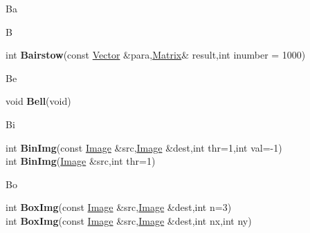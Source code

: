 \documentclass[10pt,titlepage]{article}
\def\functionlistentry#1#2#3#4#5#6{\noindent #1 {\bf #2}(#3) \dotfill #6\\}
\def\letterref#1{}
\def\letterlabel#1{\vspace{0.5cm}\centerline{\Large #1}}
\def\letterlabelend#1{}
\begin{document}
{{\letterlabel{Ba}
\letterlabel{B}
\letterref{A}
\letterref{B}
\letterref{C}
\letterref{D}
\letterref{E}
\letterref{F}
\letterref{G}
\letterref{H}
\letterref{I}
\letterref{K}
\letterref{L}
\letterref{M}
\letterref{N}
\letterref{O}
\letterref{P}
\letterref{Q}
\letterref{R}
\letterref{S}
\letterref{T}
\letterref{U}
\letterref{V}
\letterref{W}
\letterref{X}
\letterref{Y}
\letterref{Z}

\letterref{Ba}
\letterref{Be}
\letterref{Bi}
\letterref{Bo}
\letterlabelend{Ba}
\functionlistentry{int}{Bairstow}{const \hyperlink{Vector}{Vector} \&para,\hyperlink{Matrix}{Matrix}\& result,int inumber = 1000}{1399}{numeric}{}

\letterlabel{Be}
\letterref{A}
\letterref{B}
\letterref{C}
\letterref{D}
\letterref{E}
\letterref{F}
\letterref{G}
\letterref{H}
\letterref{I}
\letterref{K}
\letterref{L}
\letterref{M}
\letterref{N}
\letterref{O}
\letterref{P}
\letterref{Q}
\letterref{R}
\letterref{S}
\letterref{T}
\letterref{U}
\letterref{V}
\letterref{W}
\letterref{X}
\letterref{Y}
\letterref{Z}

\letterref{Ba}
\letterref{Be}
\letterref{Bi}
\letterref{Bo}
\letterlabelend{Be}
\functionlistentry{void}{Bell}{void}{1424}{genericTools}{}

\letterlabel{Bi}
\letterref{A}
\letterref{B}
\letterref{C}
\letterref{D}
\letterref{E}
\letterref{F}
\letterref{G}
\letterref{H}
\letterref{I}
\letterref{K}
\letterref{L}
\letterref{M}
\letterref{N}
\letterref{O}
\letterref{P}
\letterref{Q}
\letterref{R}
\letterref{S}
\letterref{T}
\letterref{U}
\letterref{V}
\letterref{W}
\letterref{X}
\letterref{Y}
\letterref{Z}

\letterref{Ba}
\letterref{Be}
\letterref{Bi}
\letterref{Bo}
\letterlabelend{Bi}
\functionlistentry{int}{BinImg}{const \hyperlink{Image}{Image} \&src,\hyperlink{Image}{Image} \&dest,int thr=1,int val=-1}{1064}{processing}{}
\functionlistentry{int}{BinImg}{\hyperlink{Image}{Image} \&src,int thr=1}{1065}{processing}{}

\letterlabel{Bo}
\letterref{A}
\letterref{B}
\letterref{C}
\letterref{D}
\letterref{E}
\letterref{F}
\letterref{G}
\letterref{H}
\letterref{I}
\letterref{K}
\letterref{L}
\letterref{M}
\letterref{N}
\letterref{O}
\letterref{P}
\letterref{Q}
\letterref{R}
\letterref{S}
\letterref{T}
\letterref{U}
\letterref{V}
\letterref{W}
\letterref{X}
\letterref{Y}
\letterref{Z}

\letterref{Ba}
\letterref{Be}
\letterref{Bi}
\letterref{Bo}
\letterlabelend{Bo}
\functionlistentry{int}{BoxImg}{const \hyperlink{Image}{Image} \&src,\hyperlink{Image}{Image} \&dest,int n=3}{343}{filter}{}
\functionlistentry{int}{BoxImg}{const \hyperlink{Image}{Image} \&src,\hyperlink{Image}{Image} \&dest,int nx,int ny}{344}{filter}{}

}}
\end{document}
